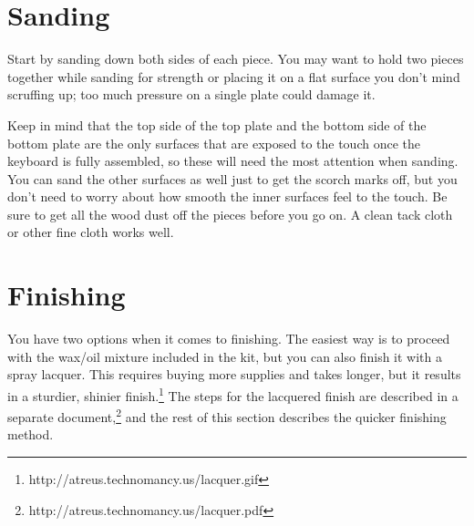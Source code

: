 \documentclass{article}
\begin{document}
\section{Sanding}

Start by sanding down both sides of each piece. You may want to
hold two pieces together while sanding for strength or placing it on a
flat surface you don't mind scruffing up; too much pressure on a
single plate could damage it.

\vspace{1em}
\noindent{}
\vspace{1em}

Keep in mind that the top side of the top plate and the bottom side of
the bottom plate are the only surfaces that are exposed to the touch
once the keyboard is fully assembled, so these will need the most
attention when sanding. You can sand the other surfaces as well just
to get the scorch marks off, but you don't need to worry about how
smooth the inner surfaces feel to the touch. Be sure to get all the
wood dust off the pieces before you go on. A clean tack cloth or other
fine cloth works well.

\section{Finishing}

You have two options when it comes to finishing. The easiest way is to
proceed with the wax/oil mixture included in the kit, but you can also
finish it with a spray lacquer. This requires buying more supplies and
takes longer, but it results in a sturdier, shinier
finish.\footnote{http://atreus.technomancy.us/lacquer.gif} The steps
for the lacquered finish are described in a separate
document,\footnote{http://atreus.technomancy.us/lacquer.pdf} and the
rest of this section describes the quicker finishing method.
\end{document}
